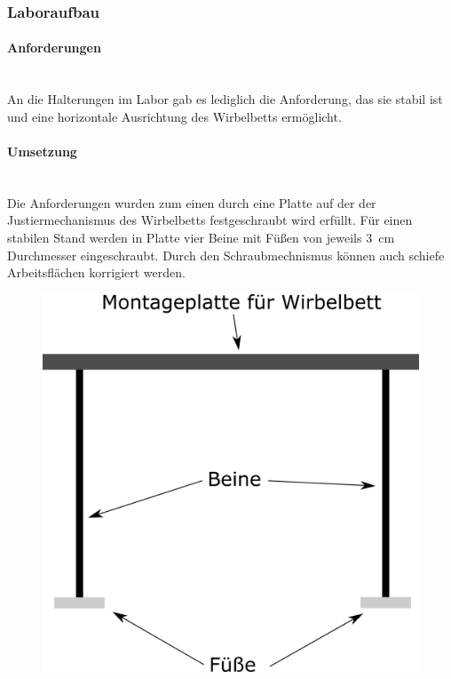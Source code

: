 \subsubsection{Laboraufbau}

\paragraph{Anforderungen}
\hfill \\
An die Halterungen im Labor gab es lediglich die Anforderung, das sie stabil ist und eine horizontale Ausrichtung des Wirbelbetts ermöglicht.

\paragraph{Umsetzung}
\hfill \\
Die Anforderungen wurden zum einen durch eine Platte auf der der Justiermechanismus des Wirbelbetts festgeschraubt wird erfüllt. Für einen stabilen Stand werden in Platte vier Beine mit Füßen von jeweils \SI{3}{cm} Durchmesser eingeschraubt. Durch den Schraubmechnismus können auch schiefe Arbeitsflächen korrigiert werden.



\begin{figure}[h]
	\begin{center}
	\includegraphics[scale=0.6]{Halterung_Labor_Seite.png}
    \end{center}
\end{figure}




